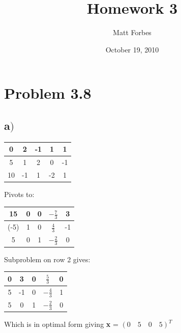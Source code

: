 \documentclass[a4paper,12pt]{article}
\begin{document}
\title{Homework 3}
\author{Matt Forbes}
\date{October 19, 2010}
\maketitle
\section*{Problem 3.8}
\subsection*{a\()\)}
\begin{center}
  \begin{tabular}{| c | c c c c |}
    \hline
    0 & 2 & -1 & 1 & 1 \\
    \hline
    5 & 1 & 2 & 0 & -1 \\
    10 & -1 & 1 & -2 & 1 \\
    \hline
  \end{tabular}
\end{center}
Pivots to:
\begin{center}
  \begin{tabular}{| c | c c c c |}
    \hline
    15 & 0 & 0 & \(-\frac{7}{3}\) & 3 \\
    \hline
    (-5) & 1 & 0 & \(\frac{4}{3}\) & -1 \\
    5 & 0 & 1 & \(-\frac{2}{3}\) & 0 \\
    \hline
  \end{tabular}
\end{center}
Subproblem on row 2 gives:
\begin{center}
  \begin{tabular}{| c | c c c c |}
    \hline
    0 & 3 & 0 & \(\frac{5}{3}\) & 0 \\
    \hline
    5 & -1 & 0 & \(-\frac{4}{3}\) & 1 \\
    5 & 0 & 1 & \(-\frac{2}{3}\) & 0 \\
    \hline
  \end{tabular}
\end{center}
Which is in optimal form giving {\bf x} = \( (0 \quad 5 \quad 0 \quad  5)^T \)
\end{document}
